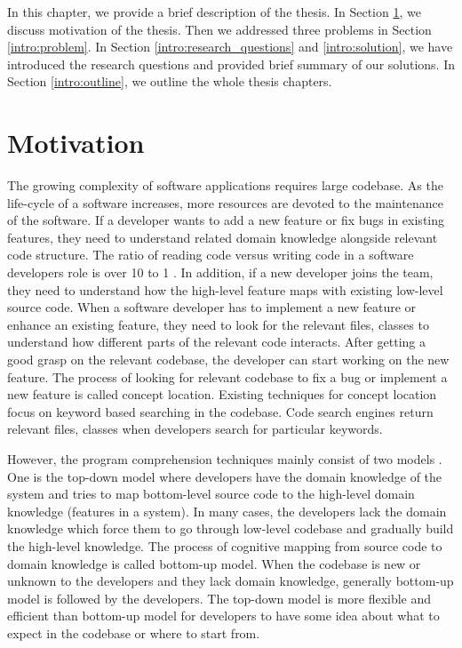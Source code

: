 In this chapter, we provide a brief description of the thesis. In Section \ref{intro:motivation}, we discuss motivation of the thesis. Then we addressed three problems in Section \ref{intro:problem}. In Section \ref{intro:research_questions} and \ref{intro:solution}, we have introduced the research questions and provided brief summary of our solutions. In Section \ref{intro:outline}, we outline the whole thesis chapters. 


\section{Motivation}
\label{intro:motivation}
 The growing complexity of software applications requires large codebase. As the life-cycle of a software increases, more resources are devoted to the maintenance of the software. If a developer wants to add a new feature or fix bugs in existing features, they need to understand related domain knowledge alongside relevant code structure. The ratio of reading code versus writing code in a software developers role is over 10 to 1 \cite{martin2008clean}. In addition, if a new developer joins the team, they need to understand how the high-level feature maps with existing low-level source code. When a software developer has to implement a new feature or enhance an existing feature, they need to look for the relevant files, classes to understand how different parts of the relevant code interacts. After getting a good grasp on the relevant codebase, the developer can start working on the new feature. The process of looking for relevant codebase to fix a bug or implement a new feature is called concept location. Existing techniques for concept location focus on keyword based searching in the codebase. Code search engines return relevant files, classes when developers search for particular keywords. 
 
 However, the program comprehension techniques mainly consist of two models \cite{tilley1998reverseEngineeringFramework, von1993programToolRequirements, siegmund2016programPastFuture}. One is the top-down model where developers have the domain knowledge of the system and tries to map bottom-level source code to the high-level domain knowledge (features in a system). In many cases, the developers lack the domain knowledge which force them to go through low-level codebase and gradually build the high-level knowledge. The process of cognitive mapping from source code to domain knowledge is called bottom-up model. When the codebase is new or unknown to the developers and they lack domain knowledge, generally bottom-up model is followed by the developers. The top-down model is more flexible and efficient than bottom-up model for developers to have some idea about what to expect in the codebase or where to start from. 
 
